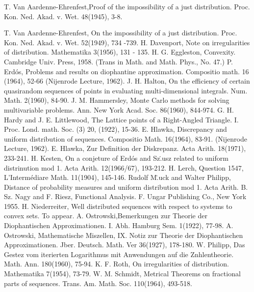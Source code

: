 \begin{thebibliography}{99}
 {T. Van Aardenne-Ehrenfest},\pageoriginale Proof of the impossibility of a just distribution. Proc. Kon. Ned. Akad. v. Wet. 48(1945), 3-8.

 {T. Van Aardenne-Ehrenfest}, On the impossibility of a just distribution. Proc. Kon. Ned. Akad. v. Wet. 52(1949), 734 -739. 
 {H. Davenport}, Note on irregularities of distribution. Mathematika 3(1956), 131 - 135.
 {H. G. Eggleston}, Convexity. Cambridge Univ. Press, 1958. (Trans in Math. and Math. Phys., No. 47.)
 {P. Erd\'{o}s}, Problems and results on diophantine approximation. Compositio math. 16 (1964), 52-66 (Nijenrode Lecture, 1962).
 {J. H. Halton}, On the efficiency of certain quasirandom sequences of points in evaluating multi-dimensional integrals. Num. Math. 2(1960), 84-90.
 {J. M. Hammersley}, Monte Carlo methods for solving multivariable problems. Ann. New York Acad. Soc. 86(1960), 844-974.
 {G. H. Hardy and J. E. Littlewood}, The Lattice points of a Right-Angled Triangle. I. Proc. Lond. math. Soc. (3) 20, (1922), 15-36.
 {E. Hlawka}, Discrepancy and uniform distribution of sequences. Compositio Math. 16(1964), 83-91. (Nijenrode Lecture, 1962).
 {E. Hlawka}, Zur Definition der Diskrepanz. Acta Arith. 18(1971), 233-241.
 {H. Kesten}, On a conjeture of Erd\'{o}s and Sz\..{u}sz related to uniform distrinution mod 1. Acta Arith. 12(1966/67), 193-212.
 {H. Lerch}, Question 1547, L'Interm\'{e}diare Math. 11(1904), 145-146.
 {Rudolf M\..{u}ck and Walter Philipp}, Distance of probability measures and uniform distribution mod 1. Acta Arith.
 {B. Sz. Nagy and F. Riesz}, Functional Analysis. F. Ungar Publishing Co., New York 1955.
 {H. Niederreiter}, Well distributed sequences with respect to systems to convex sets. To appear.
 {A. Ostrowski},\pageoriginale Bemerkungen zur Theorie der Diophantischen Approximationen. I. Abh. Hamburg Sem. 1(1922), 77-98.
 {A. Ostrowski}, Mathematische Miszellen, IX. Notiz zur Theorie der Diophantischen Approximationen. Jber. Deutsch. Math. Ver 36(1927), 178-180.
 {W. Philipp}, Das Gestez vom iterierten Logarithmus mit Anwendungen auf die Znhlentheorie. Math. Ann. 180(1960), 75-94.
 {K. F. Roth}, On irregularities of distribution. Mathematika 7(1954), 73-79.
 {W. M. Schmidt}, Metrical Theorems on fractional parts of sequences. Trans. Am. Math. Soc. 110(1964), 493-518.

\end{thebibliography}
